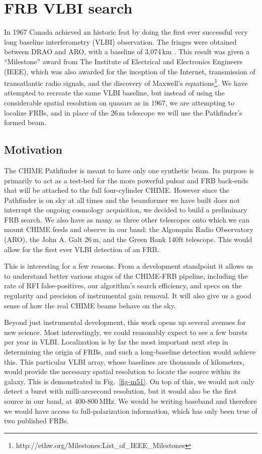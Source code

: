 \section{FRB VLBI search}
\label{vlbi_frb}

In 1967 Canada achieved an historic feat by doing 
the first ever successful very long 
baseline interferometry (VLBI) observation. The fringes were 
obtained between DRAO and ARO, with a baseline of 3,074\,km 
\citep{1967Natur.215...38B}. 
This result was given a ``Milestone'' award from 
The Institute of Electrical and Electronics Engineers (IEEE), 
which was also awarded for the inception of the Internet, transmission 
of transatlantic radio signals, and the discovery of Maxwell's 
equations\footnote{http://ethw.org/Milestones:List\_of\_IEEE\_Milestones}. 
We have attempted to recreate the same VLBI baseline, but instead of 
using the considerable spatial resolution on quasars as in 1967, 
we are attempting to localize FRBs, and in place of the 
26\,m telescope we will use the Pathfinder's formed beam.


\subsection{Motivation}

The CHIME Pathfinder is meant to have only one synthetic beam. 
Its purpose is primarily to act as a test-bed for the more powerful 
pulsar and FRB back-ends that will be attached to the 
full four-cylinder CHIME. However since the Pathfinder is on 
sky at all times and the beamformer we have built does not 
interrupt the ongoing cosmology acquisition, we decided to 
build a preliminary FRB search. We also have as many as three 
other telescopes onto which we can mount 
CHIME feeds and observe in our band: the Algonquin Radio Observatory (ARO), 
the John A. Galt 26\,m, and the Green Bank 140ft telescope. This would
allow for the first ever VLBI detection of an FRB. 

This is interesting for a few reasons. From a development 
standpoint it allows us to understand better various stages of the 
CHIME-FRB pipeline, including the rate of 
RFI false-positives, our algorithm's search 
efficiency, and specs on the regularity and precision of instrumental 
gain removal. It will also give us a good sense of how the real CHIME 
beams behave on the sky. 

Beyond just instrumental development, this work
opens up several avenues for new science. 
Most interestingly, 
we could reasonably expect to see a few bursts per year in 
VLBI. Localization is by far the most 
important next step in determining the origin of FRBs, and 
such a long-baseline detection would achieve this. This particular VLBI 
array, whose baselines are thousands of kilometers, would provide 
the necessary spatial resolution to locate the source 
within its galaxy. This is demonstrated in Fig.~\ref{fig-m51}.
On top of this, we would not only detect a burst with 
milli-arcsecond resolution, but it would also be the first source 
in our band, at 400-800\,MHz. We 
would be writing baseband and therefore we 
would have access to full-polarization information, which 
has only been true of two published FRBs.

